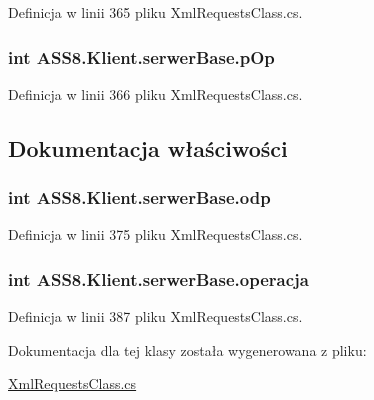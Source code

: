 Definicja w linii 365 pliku XmlRequestsClass.cs.\hypertarget{a00023_548856d9370b6b809f7218ee78af38b7}{
\subsubsection[{pOp}]{\setlength{\rightskip}{0pt plus 5cm}int {\bf ASS8.Klient.serwerBase.pOp}}}
\label{d3/d52/a00023_548856d9370b6b809f7218ee78af38b7}




Definicja w linii 366 pliku XmlRequestsClass.cs.

\subsection{Dokumentacja właściwości}
\hypertarget{a00023_536a1e136873a8bc73f912bb72ee154a}{
\subsubsection[{odp}]{\setlength{\rightskip}{0pt plus 5cm}int ASS8.Klient.serwerBase.odp}}
\label{d3/d52/a00023_536a1e136873a8bc73f912bb72ee154a}




Definicja w linii 375 pliku XmlRequestsClass.cs.\hypertarget{a00023_9e0414e76ae1f264010bd1dc1abbaef6}{
\subsubsection[{operacja}]{\setlength{\rightskip}{0pt plus 5cm}int ASS8.Klient.serwerBase.operacja}}
\label{d3/d52/a00023_9e0414e76ae1f264010bd1dc1abbaef6}




Definicja w linii 387 pliku XmlRequestsClass.cs.

Dokumentacja dla tej klasy została wygenerowana z pliku:\begin{CompactItemize}
\item 
\hyperlink{a00055}{XmlRequestsClass.cs}\end{CompactItemize}

